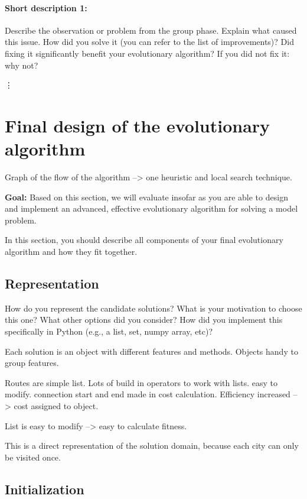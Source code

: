 \documentclass[a4paper,10pt]{article}
\newcommand{\ReplaceMe}[1]{{\color{blue}#1}}
\newcommand{\RemoveMe}[1]{{\color{purple}#1}}
\begin{document}
\paragraph{Short description 1:} \ReplaceMe{Describe the observation or problem from the group phase. Explain what caused this issue. How did you solve it (you can refer to the list of improvements)? Did fixing it significantly benefit your evolutionary algorithm? If you did not fix it: why not?}

\vdots

\section{Final design of the evolutionary algorithm} 
Graph of the flow of the algorithm --> one heuristic and local search technique. 


\RemoveMe{\textbf{Goal:} Based on this section, we will evaluate insofar as you are able to design and implement an advanced, effective evolutionary algorithm for solving a model problem.}

\ReplaceMe{In this section, you should describe all components of your final evolutionary algorithm and how they fit together.}

\subsection{Representation}

\ReplaceMe{How do you represent the candidate solutions? What is your motivation to choose this one? What other options did you consider? How did you implement this specifically in Python (e.g., a list, set, numpy array, etc)?}

Each solution is an object with different features and methods. Objects handy to group features.

Routes are simple list. Lots of build in operators to work with lists. easy to modify.  connection start and end made in cost calculation. Efficiency increased --> cost assigned to object. 

List is easy to modify --> easy to calculate fitness. 

This is a direct representation of the solution domain, because each city can only be visited once.

\subsection{Initialization}
\end{document}
